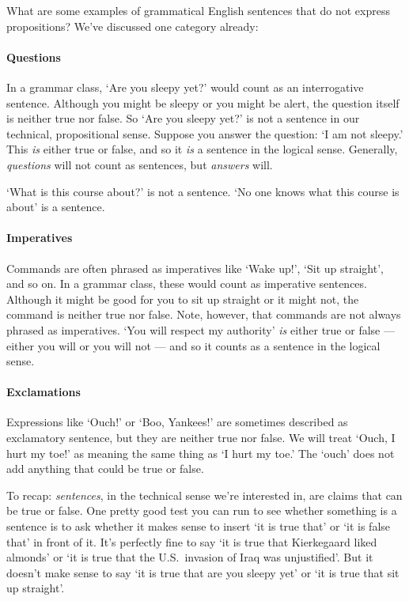 What are some examples of grammatical English sentences that do not express propositions? We've discussed one category already:

\paragraph{Questions} In a grammar class, `Are you sleepy yet?' would count as an interrogative sentence. Although you might be sleepy or you might be alert, the question itself is neither true nor false. So `Are you sleepy yet?' is not a sentence in our technical, propositional sense. Suppose you answer the question: `I am not sleepy.' This \emph{is} either true or false, and so it \emph{is} a sentence in the logical sense. Generally, \emph{questions} will not count as sentences, but \emph{answers} will. 

`What is this course about?' is not a sentence. `No one knows what this course is about' is a sentence.

\paragraph{Imperatives} Commands are often phrased as imperatives like `Wake up!', `Sit up straight', and so on. In a grammar class, these would count as imperative sentences. Although it might be good for you to sit up straight or it might not, the command is neither true nor false. Note, however, that commands are not always phrased as imperatives. `You will respect my authority' \emph{is} either true or false --- either you will or you will not --- and so it counts as a sentence in the logical sense.

\paragraph{Exclamations} Expressions like `Ouch!' or `Boo, Yankees!' are sometimes described as exclamatory sentence, but they are neither true nor false. We will treat `Ouch, I hurt my toe!' as meaning the same thing as `I hurt my toe.' The `ouch' does not add anything that could be true or false.

To recap: \emph{sentences}, in the technical sense we're interested in, are claims that can be true or false. One pretty good test you can run to see whether something is a sentence is to ask whether it makes sense to insert `it is true that' or `it is false that' in front of it. It's perfectly fine to say `it is true that Kierkegaard liked almonds' or `it is true that the U.S.\ invasion of Iraq was unjustified'. But it doesn't make sense to say `it is true that are you sleepy yet' or `it is true that sit up straight'.


